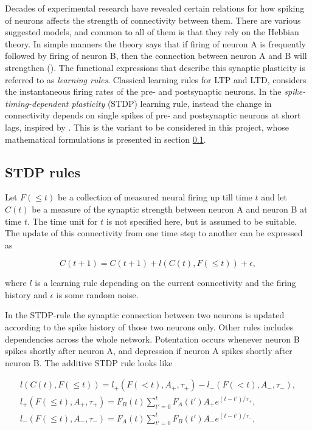Decades of experimental research have revealed certain relations for how spiking of neurons affects the strength of connectivity between them. There are various suggested models, and common to all of them is that they rely on the Hebbian theory. In simple manners the theory says that if firing of neuron A is frequently followed by firing of neuron B, then the connection between neuron A and B will strengthen (\cite{Hebb}). The functional expressions that describe this synaptic plasticity is referred to as \textit{learning rules}. Classical learning rules for LTP and LTD, considers the instantaneous firing rates of the pre- and postsynaptic neurons. In the \textit{spike-timing-dependent plasticity} (STDP) learning rule, instead the change in connectivity depends on single spikes of pre- and postsynaptic neurons at short lags, inspired by \cite{Linderman}. This is the variant to be considered in this project, whose mathematical formulations is presented in section \ref{sec:LR}.

\subsection{STDP rules}
\label{sec:LR}

Let $F(\leq t)$ be a collection of measured neural firing up till time $t$ and let $C(t)$ be a measure of the synaptic strength between neuron A and neuron B at time $t$. The time unit for $t$ is not specified here, but is assumed to be suitable. The update of this connectivity from one time step to another can be expressed as

\begin{equation}
\label{eq:LR}
    C(t+1) = C(t+1) + l(C(t), F(\leq t)) + \epsilon,
\end{equation}

where $l$ is a learning rule depending on the current connectivity and the firing history and $\epsilon$ is some random noise. 

In the STDP-rule the synaptic connection between two neurons is updated according to the spike history of those two neurons only. Other rules includes dependencies across the whole network. Potentation occurs whenever neuron B spikes shortly after neuron A, and depression if neuron A spikes shortly after neuron B. The additive STDP rule looks like

\begin{equation}
\label{eq:STDP}
    \begin{split}
    l(C(t), F(\leq t)) = l_+(F(<t), A_+,\tau_+) - l_-(F(<t), A_-,\tau_-),\\ 
    l_+(F(\leq t), A_+,\tau_+) = F_B(t) \sum_{t'=0}^{t} F_A(t') A_+ e^{(t-t')/\tau_+},\\ 
    l_-(F(\leq t), A_-,\tau_-) = F_A(t) \sum_{t'=0}^{t} F_B(t') A_- e^{(t-t')/\tau_-},
    \end{split}
\end{equation}

